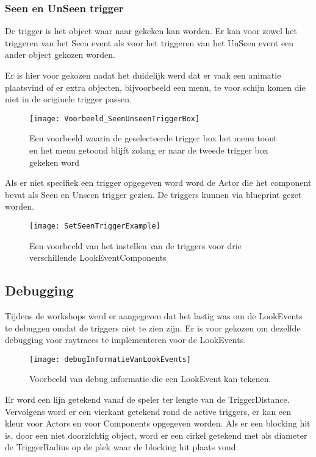 \subsubsection{Seen en UnSeen trigger}
De trigger is het object waar naar gekeken kan worden. Er kan voor zowel het triggeren van het Seen event als voor het triggeren van het UnSeen event een ander object gekozen worden.

Er is hier voor gekozen nadat het duidelijk werd dat er vaak een animatie plaatsvind of er extra objecten, bijvoorbeeld een menu, te voor schijn komen die niet in de originele trigger passen.

\begin{figure}[!ht]
  \centering
    \texttt{[image: Voorbeeld\_SeenUnseenTriggerBox]}
    \caption{Een voorbeeld waarin de geselecteerde trigger box het menu toont en het menu getoond blijft zolang er naar de tweede trigger box gekeken word}
\end{figure}

Als er niet specifiek een trigger opgegeven word word de Actor die het component bevat als Seen en Unseen trigger gezien. De triggers kunnen via blueprint gezet worden.

\begin{figure}[!ht]
  \centering
    \texttt{[image: SetSeenTriggerExample]}
    \caption{Een voorbeeld van het instellen van de triggers voor drie verschillende LookEventComponents}
\end{figure}

\subsection{Debugging}
Tijdens de workshops werd er aangegeven dat het lastig was om de LookEvents te debuggen omdat de triggers niet te zien zijn. Er is voor gekozen om dezelfde debugging voor raytraces te implementeren voor de LookEvents.

\begin{figure}[!ht]
  \centering
    \texttt{[image: debugInformatieVanLookEvents]}
    \caption{Voorbeeld van debug informatie die een LookEvent kan tekenen.}
\end{figure}

Er word een lijn getekend vanaf de speler ter lengte van de TriggerDistance. Vervolgens word er een vierkant getekend rond de active triggers, er kan een kleur voor Actors en voor Components opgegeven worden. Als er een blocking hit is, door een niet doorzichtig object, word er een cirkel getekend met als diameter de TriggerRadius op de plek waar de blocking hit plaats vond.

